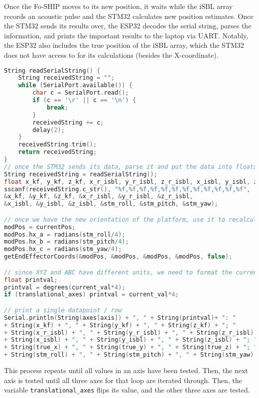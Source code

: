 \documentclass[11pt]{ucthesisCP}
\begin{document}
Once the Fo-SHIP moves to its new position, it waits while the iSBL array records an acoustic pulse and the STM32 calculates new position estimates. Once the STM32 sends its results over, the ESP32 decodes the serial string, parses the information, and prints the important results to the laptop via UART. Notably, the ESP32 also includes the true position of the iSBL array, which the STM32 does not have access to for its calculations (besides the X-coordinate).

\begin{lstlisting}[language=C++]
String readSerialString() {
	String receivedString = "";
	while (SerialPort.available()) {
		char c = SerialPort.read();
		if (c == '\r' || c == '\n') {
			break;
		}
		receivedString += c;
		delay(2);
	}
	receivedString.trim();
	return receivedString;
}
// once the STM32 sends its data, parse it and put the data into floats
String receivedString = readSerialString();
float x_kf, y_kf, z_kf, x_r_isbl, y_r_isbl, z_r_isbl, x_isbl, y_isbl, z_isbl;
sscanf(receivedString.c_str(), "%f,%f,%f,%f,%f,%f,%f,%f,%f,%f,%f,%f", 
&x_kf, &y_kf, &z_kf, &x_r_isbl, &y_r_isbl, &z_r_isbl, 
&x_isbl, &y_isbl, &z_isbl, &stm_roll, &stm_pitch, &stm_yaw);

// once we have the new orientation of the platform, use it to recalculate the true end effector pos
modPos = currentPos;
modPos.hx_a = radians(stm_roll/4);
modPos.hx_b = radians(stm_pitch/4);
modPos.hx_c = radians(stm_yaw/4);
getEndEffectorCoords(&modPos, &modPos, &modPos, &modPos, false);

// since XYZ and ABC have different units, we need to format the current value differently
float printval;
printval = degrees(current_val*4);
if (translational_axes) printval = current_val*4;

// print a single datapoint / row
Serial.println(String(axes[axis]) + ", " + String(printval)+ ": "
+ String(x_kf) + ", " + String(y_kf) + ", " + String(z_kf) + "; " 
+ String(x_r_isbl) + ", " + String(y_r_isbl) + ", " + String(z_r_isbl) +"; "
+ String(x_isbl) + ", " + String(y_isbl) + ", " + String(z_isbl) + "; "
+ String(true_x) + ", " + String(true_y) + ", " + String(true_z) + "; "
+ String(stm_roll) + ", " + String(stm_pitch) + ", " + String(stm_yaw) +";");
\end{lstlisting}

This process repeats until all values in an axis have been tested. Then, the next axis is tested until all three axes for that loop are iterated through. Then, the variable \verb|translational_axes| flips its value, and the other three axes are tested.
\end{document}
